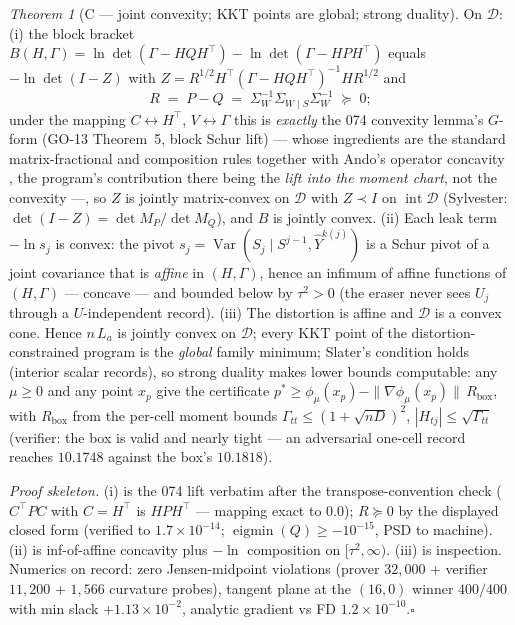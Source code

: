 \documentclass[11pt]{article}
\theoremstyle{definition}
\theoremstyle{remark}
\newtheorem{namedthm}{Theorem}
\begin{document}
\begin{namedthm}[C --- joint convexity; KKT points are global;
strong duality]
\label{thm:cvx}
On $\mathcal D$: (i) the block bracket
$B(H,\Gamma)=\ln\det(\Gamma-HQH^{\!\top})
-\ln\det(\Gamma-HPH^{\!\top})$ equals $-\ln\det(I-Z)$ with
$Z=R^{1/2}H^{\!\top}(\Gamma-HQH^{\!\top})^{-1}HR^{1/2}$ and
\[
R\;=\;P-Q\;=\;\Sigma_W^{-1}\Sigma_{W\mid S}\Sigma_W^{-1}
\;\succeq\;0 ;
\]
under the mapping $C\leftrightarrow H^{\!\top}$,
$V\leftrightarrow\Gamma$ this is \emph{exactly} the 074 convexity
lemma's $G$-form (GO-13 Theorem~5, block Schur lift) --- whose
ingredients are the standard matrix-fractional and composition rules
\cite[Sec.~3.1.7 and 3.2.4]{bib:bv04} together with Ando's operator
concavity \cite{bib:ando79}, the program's contribution there being
the \emph{lift into the moment chart}, not the convexity ---, so $Z$ is
jointly matrix-convex on $\mathcal D$ with $Z\prec I$ on
$\operatorname{int}\mathcal D$ (Sylvester:
$\det(I-Z)=\det M_P/\det M_Q$), and $B$ is jointly convex. (ii) Each
leak term $-\ln s_j$ is convex: the pivot
$s_j=\operatorname{Var}(S_j\mid S^{j-1},\hat Y^{k(j)})$ is a Schur
pivot of a joint covariance that is \emph{affine} in $(H,\Gamma)$,
hence an infimum of affine functions of $(H,\Gamma)$ ---
concave --- and bounded below by $\tau^2>0$ (the eraser never sees
$U_j$ through a $U$-independent record). (iii) The distortion is
affine and $\mathcal D$ is a convex cone. Hence $n\,L_a$ is jointly
convex on $\mathcal D$; every KKT point of the
distortion-constrained program is the \emph{global} family minimum;
Slater's condition holds (interior scalar records), so strong
duality makes lower bounds computable: any $\mu\ge0$ and any point
$x_p$ give the certificate $p^\ast\ge\phi_\mu(x_p)-
\|\nabla\phi_\mu(x_p)\|\,R_{\mathrm{box}}$, with
$R_{\mathrm{box}}$ from the per-cell moment bounds
$\Gamma_{tt}\le(1+\sqrt{nD})^2$, $|H_{tj}|\le\sqrt{\Gamma_{tt}}$
(verifier: the box is valid and nearly tight --- an adversarial
one-cell record reaches $10.1748$ against the box's $10.1818$).
\end{namedthm}

\noindent\emph{Proof skeleton.} (i) is the 074 lift verbatim after
the transpose-convention check ($C^{\!\top}\!PC$ with $C=H^{\!\top}$
is $HPH^{\!\top}$ --- mapping exact to $0.0$); $R\succeq0$ by the
displayed closed form (verified to $1.7\times10^{-14}$;
$\operatorname{eigmin}(Q)\ge-10^{-15}$, PSD to machine). (ii) is
inf-of-affine concavity plus $-\ln$ composition on
$[\tau^2,\infty)$. (iii) is inspection. Numerics on record: zero
Jensen-midpoint violations (prover $32{,}000$ + verifier
$11{,}200$ + $1{,}566$ curvature probes), tangent plane at the
$(16,0)$ winner $400/400$ with min slack $+1.13\times10^{-2}$,
analytic gradient vs FD $1.2\times10^{-10}$.\hfill$\square$
\end{document}
